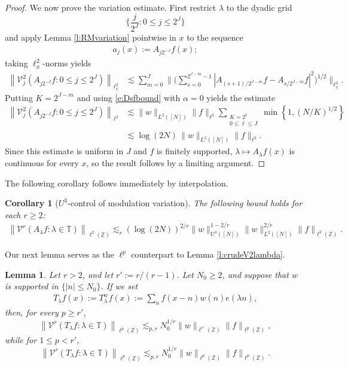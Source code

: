 \documentclass[12pt]{amsart}
\numberwithin{equation}{section}
\newtheorem{cor}[theorem]{Corollary}
\newtheorem{lemma}[theorem]{Lemma}
\theoremstyle{definition}
\begin{document}
\begin{proof}
We now prove the variation estimate.  First restrict \(\lambda\) to the dyadic grid
\[ \{\frac{j}{2^J} :0\leq j\leq2^J\}\]
and apply Lemma \ref{l:RMvariation} pointwise in
\(x\) to the sequence
\begin{align}
    a_j(x):=A_{j2^{-J}}f(x);
\end{align}
taking \(\ell^2_x\)-norms yields
\begin{align}
    \left\|\mathcal V^2_j(A_{j2^{-J}}f:0\leq j\leq2^J)\right\|_{\ell^2_x}
    &\lesssim
    \sum_{m=0}^J
    \Big\|
    \big(
    \sum_{s=0}^{2^{J-m}-1}
    |A_{(s+1)/2^{J-m}}f-A_{s/2^{J-m}}f|^2
    \big)^{1/2}
    \Big\|_{\ell^2_x}.
\end{align}
Putting \(K=2^{J-m}\) and using \eqref{e:Dsfbound} with \(\alpha=0\) yields the estimate
\begin{align}
    \left\|\mathcal V^2_j(A_{j2^{-J}}f:0\leq j\leq2^J)\right\|_{\ell^2}
    &\lesssim
    \|w\|_{L^2([N])}\|f\|_{\ell^2}
    \sum_{\substack{K=2^\ell\\0\leq \ell\leq J}}
    \min\left\{1,(N/K)^{1/2}\right\}\\
    &\lesssim
    \log(2N)\,\|w\|_{L^2([N])}\|f\|_{\ell^2}.
\end{align}
Since this estimate is uniform in \(J\) and \(f\) is finitely supported, \(\lambda\mapsto
A_\lambda f(x)\) is continuous for every \(x\), so the result follows by a limiting argument.
\end{proof}
The following corollary follows immediately by interpolation.
\begin{cor}[$U^3$-control of modulation variation]\label{c:U3modvariation}
The following bound holds for each $r \geq 2$:
\begin{align}\label{e:U3varlambda}
    \left\|\mathcal V^r(A_\lambda f : \lambda \in \mathbb{T}) \right\|_{\ell^2(\mathbb Z)}
    \lesssim_r
    (\log(2N))^{2/r}
    \|w\|_{U^3([N])}^{1-2/r}
    \|w\|_{L^2([N])}^{2/r}
    \|f\|_{\ell^2(\mathbb Z)}.
\end{align}
\end{cor}

Our next lemma serves as the $\ell^p$ counterpart to Lemma \ref{l:crudeV2lambda}.


\begin{lemma}
\label{l:crude-lambda-var-scale}
Let \(r>2\), and let \(r':=r/(r-1)\).  Let \(N_0\geq2\), and suppose that $w$ is supported in \(\{|n|\leq N_0\}\). If we set
\begin{align}
    T_\lambda f(x) := T_\lambda^w f(x) := \sum_n f(x-n) w(n) e(\lambda n),
\end{align}
then, for every \(p\geq r'\),
\[
    \left\|
    \mathcal V^r (T_\lambda f : \lambda \in \mathbb{T})
    \right\|_{\ell^p(\mathbb Z)}
    \lesssim_{p,r}
    N_0^{1/r}\|w\|_{\ell^{r'}(\mathbb Z)}
    \|f\|_{\ell^p(\mathbb Z)},
\]
while for \(1\leq p<r'\),
\[
    \left\|
    \mathcal V^r(T_\lambda f : \lambda \in \mathbb{T})
    \right\|_{\ell^p(\mathbb Z)}
    \lesssim_{p,r}
    N_0^{1/r}\|w\|_{\ell^{p}(\mathbb Z)}
    \|f\|_{\ell^p(\mathbb Z)}.
\]
\end{lemma}
\end{document}
